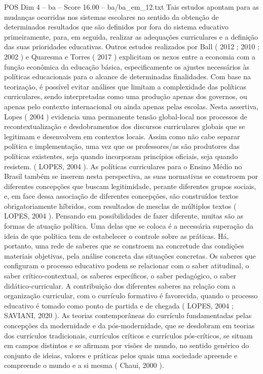 \begin{textsample}{POS Dim 4 – ba – Score 16.00 – ba/ba\_em\_12.txt}
Tais estudos apontam para as mudanças ocorridas nos sistemas escolares no sentido da obtenção de determinados resultados que são definidos por fora do sistema educativo primeiramente, para, em seguida, realizar as adequações curriculares e a definição das suas prioridades educativas.
Outros estudos realizados por Ball ( 2012 ; 2010 ; 2002 ) e Quaresma e Torres ( 2017 ) explicitam os nexos entre a economia com a função econômica da educação básica, especificamente os ajustes necessários às políticas educacionais para o alcance de determinadas finalidades.
Com base na teorização, é possível evitar análises que limitam a complexidade das políticas curriculares, sendo interpretadas como uma produção apenas dos governos, ou apenas pelo contexto internacional ou ainda apenas pelas escolas.
Nesta assertiva, Lopes ( 2004 ) evidencia uma permanente tensão global-local nos processos de recontextualização e desdobramentos dos discursos curriculares globais que se legitimam e desenvolvem em contextos locais.
Assim como não cabe separar política e implementação, uma vez que os professores/as são produtores das políticas existentes, seja quando incorporam princípios oficiais, seja quando resistem. ( LOPES, 2004 ).
As políticas curriculares para o Ensino Médio no Brasil também se inserem nesta perspectiva, as suas normativas se constroem por diferentes concepções que buscam legitimidade, perante diferentes grupos sociais, e, em face dessa associação de diferentes concepções, são construídos textos obrigatoriamente híbridos, com resultados de mesclas de múltiplos textos ( LOPES, 2004 ).
Pensando em possibilidades de fazer diferente, muitas são as formas de atuação política.
Uma delas que se coloca é a necessária superação da ideia de que política tem de estabelecer o controle sobre as práticas.
Há, portanto, uma rede de saberes que se constroem na concretude das condições materiais objetivas, pela análise concreta das situações concretas.
Os saberes que configuram o processo educativo podem se relacionar com o saber atitudinal, o saber crítico-contextual, os saberes específicos, o saber pedagógico, o saber didático-curricular.
A contribuição dos diferentes saberes na relação com a organização curricular, com o currículo formativo é favorecida, quando o processo educativo é tomado como ponto de partida e de chegada ( LOPES, 2004 ; SAVIANI, 2020 ).
As teorias contemporâneas do currículo fundamentadas pelas concepções da modernidade e da pós-modernidade, que se desdobram em teorias dos currículos tradicionais, currículos críticos e currículos pós-críticos, se situam em campos distintos e se afirmam por visões de mundo, no sentido genérico do conjunto de ideias, valores e práticas pelos quais uma sociedade apreende e compreende o mundo e a si mesma ( Chaui, 2000 ).

\end{textsample}
